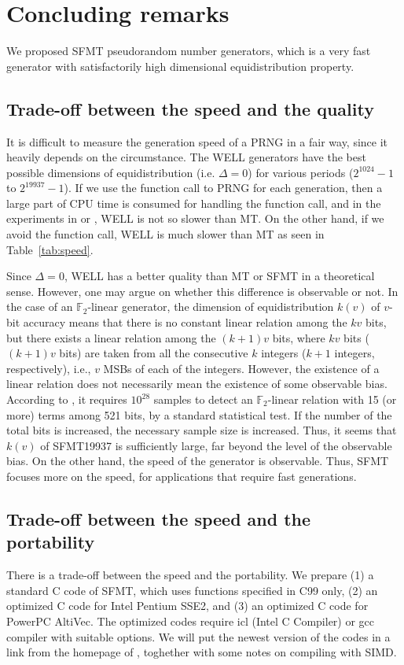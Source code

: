 \documentclass[acmnow]{acmtrans2m}
\def\F2{{\mathbb F}_2}
\begin{document}
\section{Concluding remarks}
We proposed SFMT pseudorandom number generators, 
which is a very fast generator with satisfactorily
high dimensional equidistribution property. 

\subsection{Trade-off between the speed and the quality}
It is difficult to measure the generation speed of a PRNG in a fair way,
since it heavily depends on the circumstance. 
The 
WELL \cite{WELL} generators have the best possible dimensions of 
equidistribution (i.e. $\Delta=0$)
for various periods ($2^{1024}-1$ to $2^{19937}-1$).
If we use the function call to PRNG
for each generation, then a large part of CPU time
is consumed for handling the function call, and in the 
experiments in \cite{WELL} or \cite{XORSHIFT}, WELL 
is not so slower than MT. On the other hand, if we avoid
the function call, WELL is much slower than MT as seen
in Table~\ref{tab:speed}. 

Since $\Delta=0$, WELL has a better quality than MT or SFMT
in a theoretical sense. 
However, one may argue on whether this difference is 
observable or not. In the case of an $\F2$-linear generator,
the dimension of equidistribution $k(v)$ of $v$-bit accuracy
means that
there is no constant linear relation among the 
$kv$ bits, but there exists a linear relation among
the $(k+1)v$ bits, where $kv$ bits 
($(k+1)v$ bits) are taken from
all the consecutive $k$ integers 
($k+1$ integers, respectively), 
i.e., $v$ MSBs of each of the integers. 
However, the existence of a linear relation does not necessarily
mean the existence of some observable bias.
According to \cite{TESTWEIGHT}, it requires $10^{28}$
samples to detect an $\F2$-linear relation with 
15 (or more) terms among 521 bits, by a standard
statistical test. If the number of the 
total bits is increased, 
the necessary sample size is increased. Thus, it seems
that $k(v)$ of SFMT19937 is sufficiently large, far beyond
the level of the observable bias. 
On the other hand, the speed of the generator is 
observable.
Thus, SFMT focuses more on the speed, for applications
that require fast generations. 

\subsection{Trade-off between the speed and the portability}\label{sec:portability}
There is a trade-off between the speed and the portability.
We prepare (1) a standard C code of SFMT, which uses 
functions specified in C99 only, (2) an optimized C code for
Intel Pentium SSE2, and 
(3) an optimized C code for PowerPC AltiVec. The optimized codes require
icl (Intel C Compiler) or gcc compiler with suitable options.
We will put the newest version of the codes 
in a link from the homepage of \cite{MT}, toghether with some notes 
on compiling with SIMD.
\end{document}
